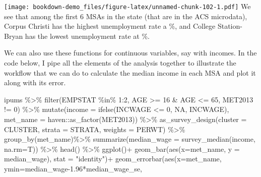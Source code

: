 \documentclass[
]{article}
\newenvironment{Shaded}{\begin{snugshade}}{\end{snugshade}}
\newcommand{\AttributeTok}[1]{\textcolor[rgb]{0.77,0.63,0.00}{#1}}
\newcommand{\ConstantTok}[1]{\textcolor[rgb]{0.00,0.00,0.00}{#1}}
\newcommand{\DecValTok}[1]{\textcolor[rgb]{0.00,0.00,0.81}{#1}}
\newcommand{\FloatTok}[1]{\textcolor[rgb]{0.00,0.00,0.81}{#1}}
\newcommand{\FunctionTok}[1]{\textcolor[rgb]{0.00,0.00,0.00}{#1}}
\newcommand{\NormalTok}[1]{#1}
\newcommand{\SpecialCharTok}[1]{\textcolor[rgb]{0.00,0.00,0.00}{#1}}
\newcommand{\StringTok}[1]{\textcolor[rgb]{0.31,0.60,0.02}{#1}}
\begin{document}
\texttt{[image: bookdown-demo\_files/figure-latex/unnamed-chunk-102-1.pdf]}
We see that among the first 6 MSAs in the state (that are in the ACS microdata), Corpus Christi has the highest unemployment rate a \%, and College Station-Bryan has the lowest unemployment rate at \%.

We can also use these functions for continuous variables, say with incomes. In the code below, I pipe all the elements of the analysis together to illustrate the workflow that we can do to calculate the median income in each MSA and plot it along with its error.

\begin{Shaded}
\begin{Highlighting}[]
\NormalTok{ipums }\SpecialCharTok{\%\textgreater{}\%}
  \FunctionTok{filter}\NormalTok{(EMPSTAT }\SpecialCharTok{\%in\%} \DecValTok{1}\SpecialCharTok{:}\DecValTok{2}\NormalTok{,}
\NormalTok{         AGE }\SpecialCharTok{\textgreater{}=} \DecValTok{16} \SpecialCharTok{\&}\NormalTok{ AGE }\SpecialCharTok{\textless{}=} \DecValTok{65}\NormalTok{, }
\NormalTok{         MET2013 }\SpecialCharTok{!=} \DecValTok{0}\NormalTok{) }\SpecialCharTok{\%\textgreater{}\%}
  \FunctionTok{mutate}\NormalTok{(}\AttributeTok{income =} \FunctionTok{ifelse}\NormalTok{(INCWAGE }\SpecialCharTok{\textless{}=} \DecValTok{0}\NormalTok{, }\ConstantTok{NA}\NormalTok{, INCWAGE),}
         \AttributeTok{met\_name =}\NormalTok{ haven}\SpecialCharTok{::}\FunctionTok{as\_factor}\NormalTok{(MET2013)) }\SpecialCharTok{\%\textgreater{}\%}
  \FunctionTok{as\_survey\_design}\NormalTok{(}\AttributeTok{cluster =}\NormalTok{ CLUSTER,}
                   \AttributeTok{strata =}\NormalTok{ STRATA,}
                   \AttributeTok{weights =}\NormalTok{ PERWT) }\SpecialCharTok{\%\textgreater{}\%}
  \FunctionTok{group\_by}\NormalTok{(met\_name)}\SpecialCharTok{\%\textgreater{}\%}
  \FunctionTok{summarize}\NormalTok{(}\AttributeTok{median\_wage =} \FunctionTok{survey\_median}\NormalTok{(income, }\AttributeTok{na.rm=}\NormalTok{T)) }\SpecialCharTok{\%\textgreater{}\%}  
  \FunctionTok{head}\NormalTok{() }\SpecialCharTok{\%\textgreater{}\%}
  \FunctionTok{ggplot}\NormalTok{()}\SpecialCharTok{+}
  \FunctionTok{geom\_bar}\NormalTok{(}\FunctionTok{aes}\NormalTok{(}\AttributeTok{x=}\NormalTok{met\_name, }\AttributeTok{y =}\NormalTok{ median\_wage), }\AttributeTok{stat =} \StringTok{"identity"}\NormalTok{)}\SpecialCharTok{+}
  \FunctionTok{geom\_errorbar}\NormalTok{(}\FunctionTok{aes}\NormalTok{(}\AttributeTok{x=}\NormalTok{met\_name,}
                    \AttributeTok{ymin=}\NormalTok{median\_wage}\FloatTok{{-}1.96}\SpecialCharTok{*}\NormalTok{median\_wage\_se,}

\end{Highlighting}
\end{Shaded}
\end{document}
